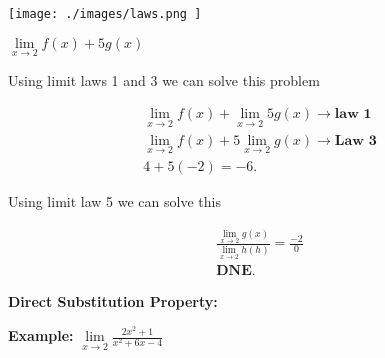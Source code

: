\documentclass{report}
\begin{document}
    \bigbreak \noindent 
    \begin{center}
        \texttt{[image:  ./images/laws.png ]}
    \end{center}
    
    \bigbreak \noindent \bigbreak \noindent 
    \bigbreak \noindent 
    \textbf{ $\lim\limits_{x \to 2}{f \left(x\right)+5g \left(x\right)}$}
    
    \bigbreak \noindent 
    \noindent Using limit laws 1 and 3 we can solve this problem

    \begin{align*}
    \lim\limits_{x \to 2}{f \left(x\right)} + \lim\limits_{x \to 2}{5g \left(x\right)} \rightarrow \textbf{law\ 1} \\ 
        \lim\limits_{x \to 2}{f \left(x\right)} + 5 \lim\limits_{x \to 2}{g \left(x\right)} \rightarrow \textbf{Law\ 3} \\ 
        4 + 5 \left(-2\right) = -6
    .\end{align*}

   \pagebreak

    \bigbreak \noindent 
    Using limit law 5 we can solve this

    \begin{align*}
        \frac{ \lim\limits_{x \to 2}{g \left(x\right)}}{ \lim\limits_{x \to 2}{h \left(h\right)}} = \frac{-2}{0} \\
        \textbf{DNE}
    .\end{align*}

    \bigbreak \noindent 
    \begin{large}
       \textbf{Direct Substitution Property:} 
    \end{large}

    \bigbreak \noindent 

    \bigbreak \noindent 
    \begin{large}
       \textbf{Example:} 
       $\lim\limits_{x \to 2}{ \frac{2x^2+1}{x^2+6x-4}}$
    \end{large}
\end{document}
